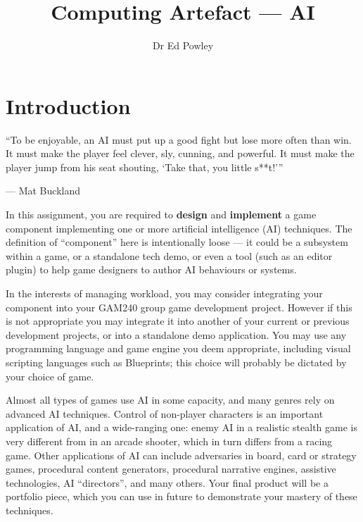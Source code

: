 \documentclass{../../fal_assignment}
\title{Computing Artefact --- AI}
\author{Dr Ed Powley}
\begin{document}
\maketitle

\section*{Introduction}

\begin{marginquote}
``To be enjoyable, an AI must put up a good fight but lose more often than win. It must make the player feel clever, sly, cunning, and powerful. It must make the player jump from his seat shouting, `Take that, you little s**t!'\thinspace''

--- Mat Buckland
\end{marginquote}

In this assignment, you are required to \textbf{design} and \textbf{implement} a game component
implementing one or more artificial intelligence (AI) techniques.
The definition of ``component'' here is intentionally loose --- it could be a subsystem within a game,
or a standalone tech demo,
or even a tool (such as an editor plugin) to help game designers to author AI behaviours or systems.

In the interests of managing workload, you may consider integrating your component into your GAM240 group game development project.
However if this is not appropriate you may integrate it into another of your current or previous development projects, or into a standalone demo application.
You may use any programming language and game engine you deem appropriate,
including visual scripting languages such as Blueprints;
this choice will probably be dictated by your choice of game.

Almost all types of games use AI in some capacity, and many genres rely on advanced AI techniques.
Control of non-player characters is an important application of AI,
and a wide-ranging one: enemy AI in a realistic stealth game is very different from in an arcade shooter,
which in turn differs from a racing game.
Other applications of AI can include adversaries in board, card or strategy games,
procedural content generators,
procedural narrative engines,
assistive technologies,
AI ``directors'',
and many others.
Your final product will be a portfolio piece, which you can use in future to demonstrate your mastery of these techniques.
\end{document}
